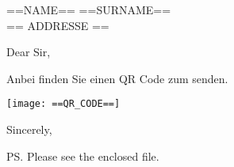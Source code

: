 \documentclass[11pt]{cicsletter}
\date{\today} %
\begin{document}
\begin{letter}{
==NAME== ==SURNAME==
\\ 
== ADDRESSE ==}

\opening{Dear Sir,}

Anbei finden Sie einen QR Code zum senden.

\texttt{[image: ==QR\_CODE==]}

\closing{Sincerely,}

\ps{Please see the enclosed file.}


\end{letter}
\end{document}
